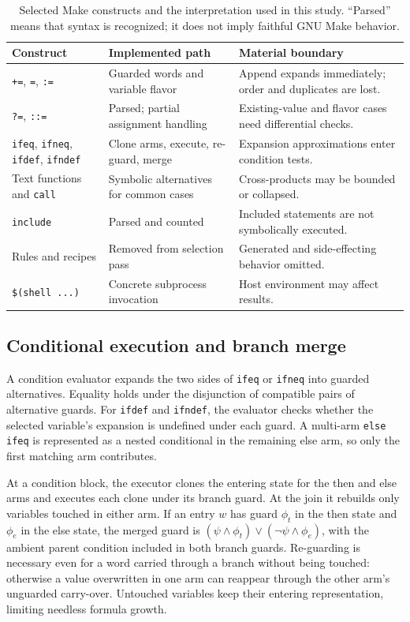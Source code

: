 \documentclass[acmsmall,screen,review]{acmart}
\begin{document}
\begin{table}[t]
\centering\footnotesize
\caption{Selected Make constructs and the interpretation used in this study. ``Parsed'' means that syntax is recognized; it does not imply faithful GNU Make behavior.}
\label{tab:scope}
\begin{tabular}{p{25mm}p{43mm}p{56mm}}
\toprule
Construct & Implemented path & Material boundary \\
\midrule
\texttt{+=}, \texttt{=}, \texttt{:=} & Guarded words and variable flavor & Append expands immediately; order and duplicates are lost. \\
\texttt{?=}, \texttt{::=} & Parsed; partial assignment handling & Existing-value and flavor cases need differential checks. \\
\texttt{ifeq}, \texttt{ifneq}, \texttt{ifdef}, \texttt{ifndef} & Clone arms, execute, re-guard, merge & Expansion approximations enter condition tests. \\
Text functions and \texttt{call} & Symbolic alternatives for common cases & Cross-products may be bounded or collapsed. \\
\texttt{include} & Parsed and counted & Included statements are not symbolically executed. \\
Rules and recipes & Removed from selection pass & Generated and side-effecting behavior omitted. \\
\texttt{\$(shell ...)} & Concrete subprocess invocation & Host environment may affect results. \\
\bottomrule
\end{tabular}
\end{table}

\subsection{Conditional execution and branch merge}
A condition evaluator expands the two sides of \texttt{ifeq} or \texttt{ifneq} into guarded alternatives. Equality holds under the disjunction of compatible pairs of alternative guards. For \texttt{ifdef} and \texttt{ifndef}, the evaluator checks whether the selected variable's expansion is undefined under each guard. A multi-arm \texttt{else ifeq} is represented as a nested conditional in the remaining else arm, so only the first matching arm contributes.

At a condition block, the executor clones the entering state for the then and else arms and executes each clone under its branch guard. At the join it rebuilds only variables touched in either arm. If an entry $w$ has guard $\phi_t$ in the then state and $\phi_e$ in the else state, the merged guard is $(\psi\land\phi_t)\lor(\neg\psi\land\phi_e)$, with the ambient parent condition included in both branch guards. Re-guarding is necessary even for a word carried through a branch without being touched: otherwise a value overwritten in one arm can reappear through the other arm's unguarded carry-over. Untouched variables keep their entering representation, limiting needless formula growth.
\end{document}
